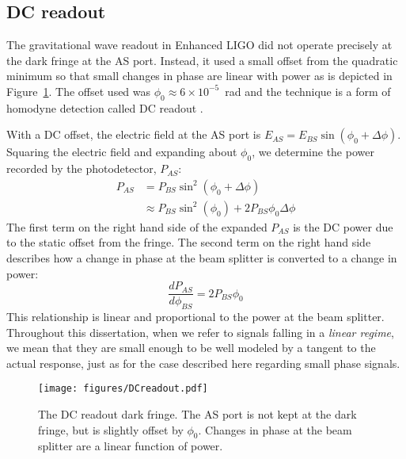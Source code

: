\subsection{DC readout}
\label{sec:DCreadout}
The gravitational wave readout in Enhanced LIGO did not operate
precisely at the dark fringe at the AS port. Instead, it used a small
offset from the quadratic minimum so that small changes in phase are
linear with power as is depicted in Figure~\ref{fig:DCreadout}. The
offset used was $\phi_0 \approx 6 \times 10^{-5}$~rad and the
technique is a form of homodyne detection called DC readout
\cite{Fricke2011DC}.

With a DC offset, the electric field at the AS port is $E_{AS} =
E_{BS}\sin{(\phi_0 + \Delta\phi)}$. Squaring the electric field and
expanding about $\phi_0$, we determine the power recorded by the
photodetector, $P_{AS}$:
\begin{align}
P_{AS} &= P_{BS} \sin^2{(\phi_0 + \Delta\phi)} \\
 &\approx P_{BS}\sin^2{(\phi_0)} + 2P_{BS}\phi_0\Delta\phi
\end{align}
The first term on the right hand side of the expanded $P_{AS}$ is the
DC power due to the static offset from the fringe. The second term on
the right hand side describes how a change in phase at the beam
splitter is converted to a change in power:
\begin{equation}
\frac{d P_{AS}}{d \phi_{BS}} =2 P_{BS} \phi_0 
\label{eq:dP_dphi}
\end{equation}
This relationship is linear and proportional to the power at the beam
splitter. Throughout this dissertation, when we refer to signals
falling in a \emph{linear regime}, we mean that they are small enough
to be well modeled by a tangent to the actual response, just as for
the case described here regarding small phase signals.

\begin{figure}
\begin{centering}
\texttt{[image: figures/DCreadout.pdf]}
\caption[The DC readout dark fringe]{The DC readout dark fringe. The
  AS port is not kept at the dark fringe, but is slightly offset by
  $\phi_0$. Changes in phase at the beam splitter are a linear
  function of power.}
\label{fig:DCreadout}
\end{centering}
\end{figure}



